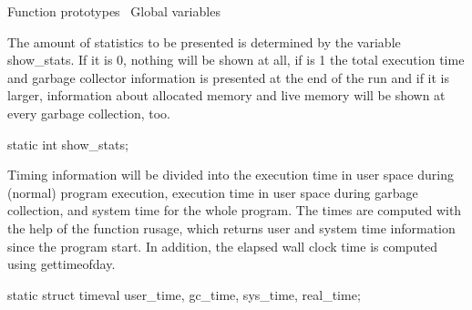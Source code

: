 \LA{}Function prototypes~{\nwtagstyle{}}\RA{}
\LA{}Global variables~{\nwtagstyle{}}\RA{}

\nwendcode{}\nwdocspar
The amount of statistics to be presented is determined by the variable
{\Tt{}show{\_}stats\nwendquote}. If it is 0, nothing will be shown at all, if is 1 the
total execution time and garbage collector information is presented at
the end of the run and if it is larger, information about allocated
memory and live memory will be shown at every garbage collection, too.

\nwenddocs{}\endmoddef\nwstartdeflinemarkup{}\nwenddeflinemarkup
static int show_stats;

\nwendcode{}\nwdocspar
Timing information will be divided into the execution time in user
space during (normal) program execution, execution time in user space
during garbage collection, and system time for the whole program. The
times are computed with the help of the function {\Tt{}rusage\nwendquote}, which
returns user and system time information since the program start. In
addition, the elapsed wall clock time is computed using
{\Tt{}gettimeofday\nwendquote}.

\nwenddocs{}\plusendmoddef\nwstartdeflinemarkup{}\nwenddeflinemarkup
static struct timeval user_time, gc_time, sys_time, real_time;


